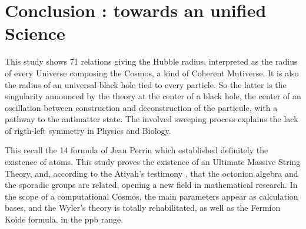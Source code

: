 \documentclass[a4paper,9pt]{article}
\begin{document}


    


\section{Conclusion : towards an unified Science}

This study shows 71 relations giving the Hubble radius, interpreted as the radius of every Universe composing the Cosmos, a kind of Coherent Mutiverse. It is also the radius of an universal black hole tied to every particle. So the latter is the singularity announced by the theory at the center of a black hole, the center of an oscillation between construction and deconstruction of the particule, with a pathway to the antimatter state. The involved sweeping process explains the lack of rigth-left symmetry  in Physics and Biology.


This recall the 14 formula of Jean Perrin which established definitely the existence of atoms. This study proves the existence of an Ultimate Massive String Theory, and, according to the Atiyah's testimony \cite{Atiyah}, that the octonion algebra and the sporadic groups are related, opening a new field in mathematical research. In the scope of a computational Cosmos, the main parameters appear as calculation bases, and the Wyler's theory is totally rehabilitated, as well as the Fermion Koide formula, in the ppb range.  
\end{document}
